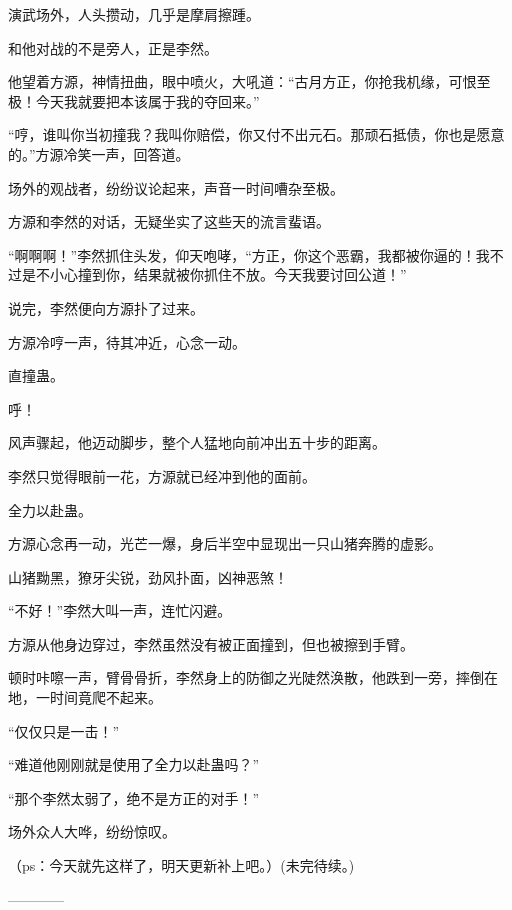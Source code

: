\begin{this_body}
演武场外，人头攒动，几乎是摩肩擦踵。

和他对战的不是旁人，正是李然。

他望着方源，神情扭曲，眼中喷火，大吼道：“古月方正，你抢我机缘，可恨至极！今天我就要把本该属于我的夺回来。”

“哼，谁叫你当初撞我？我叫你赔偿，你又付不出元石。那顽石抵债，你也是愿意的。”方源冷笑一声，回答道。

场外的观战者，纷纷议论起来，声音一时间嘈杂至极。

方源和李然的对话，无疑坐实了这些天的流言蜚语。

“啊啊啊！”李然抓住头发，仰天咆哮，“方正，你这个恶霸，我都被你逼的！我不过是不小心撞到你，结果就被你抓住不放。今天我要讨回公道！”

说完，李然便向方源扑了过来。

方源冷哼一声，待其冲近，心念一动。

直撞蛊。

呼！

风声骤起，他迈动脚步，整个人猛地向前冲出五十步的距离。

李然只觉得眼前一花，方源就已经冲到他的面前。

全力以赴蛊。

方源心念再一动，光芒一爆，身后半空中显现出一只山猪奔腾的虚影。

山猪黝黑，獠牙尖锐，劲风扑面，凶神恶煞！

“不好！”李然大叫一声，连忙闪避。

方源从他身边穿过，李然虽然没有被正面撞到，但也被擦到手臂。

顿时咔嚓一声，臂骨骨折，李然身上的防御之光陡然涣散，他跌到一旁，摔倒在地，一时间竟爬不起来。

“仅仅只是一击！”

“难道他刚刚就是使用了全力以赴蛊吗？”

“那个李然太弱了，绝不是方正的对手！”

场外众人大哗，纷纷惊叹。

（ps：今天就先这样了，明天更新补上吧。）(未完待续。)

------------

\end{this_body}

